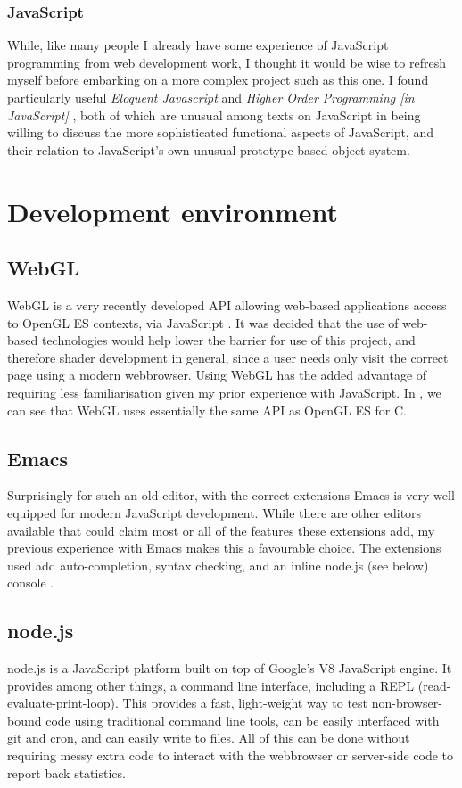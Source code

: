 \documentclass[12pt,twoside,notitlepage]{report}
\begin{document}
\subsubsection{JavaScript}
While, like many people I already have some experience of JavaScript programming from web development work, I thought it would be wise to refresh myself before embarking on a more complex project such as this one. I found particularly useful {\it Eloquent Javascript }\cite{eloquent} and {\it Higher Order Programming [in JavaScript] }\cite{higher-order}, both of which are unusual among texts on JavaScript in being willing to discuss the more sophisticated functional aspects of JavaScript, and their relation to JavaScript's own unusual prototype-based object system.


\section{Development environment}
\subsection*{WebGL}
WebGL is a very recently developed API allowing web-based applications access to OpenGL ES contexts, via JavaScript \cite{webgl-spec}. It was decided that the use of web-based technologies would help lower the barrier for use of this project, and therefore shader development in general, since a user needs only visit the correct page using a modern webbrowser. Using WebGL has the added advantage of requiring less familiarisation given my prior experience with JavaScript. In \cite{webgl-spec}, we can see that WebGL uses essentially the same API as OpenGL ES for C.


\subsection*{Emacs}
Surprisingly for such an old editor, with the correct extensions Emacs is very well equipped for modern JavaScript development. While there are other editors available that could claim most or all of the features these extensions add, my previous experience with Emacs makes this a favourable choice. The extensions used add auto-completion, syntax checking, and an inline node.js (see below) console \cite{emacs-js}.

\subsection*{node.js}
node.js is a JavaScript platform built on top of Google's V8 JavaScript engine. It provides among other things, a command line interface, including a REPL (read-evaluate-print-loop). This provides a fast, light-weight way to test non-browser-bound code using traditional command line tools, can be easily interfaced with git and cron, and can easily write to files. All of this can be done without requiring messy extra code to interact with the webbrowser or server-side code to report back statistics.
\end{document}
